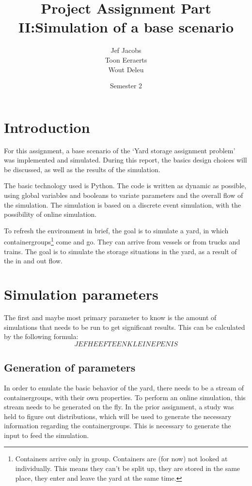 \documentclass[]{article}
\title{Project Assignment Part II:\@ Simulation of a base scenario }
\author{Jef Jacobs \\ Toon Eeraerts \\ Wout Deleu}
\date{Semester 2}
\begin{document}
\setlength{\parindent}{0pt} \maketitle \tableofcontents \newpage %

\section{Introduction}
For this assignment, a base scenario of the `Yard storage assignment problem'
was implemented and simulated. During this report, the basics design choices
will be discussed, as well as the results of the simulation.

The basic technology used is Python. The code is written as dynamic as
possible, using global variables and booleans to variate parameters and the
overall flow of the simulation. The simulation is based on a discrete event
simulation, with the possibility of online simulation.

To refresh the environment in brief, the goal is to simulate a yard, in which
containergroups\footnote{Containers arrive only in group. Containers are (for
	now) not looked at individually. This means they can't be split up, they are
	stored in the same place, they enter and leave the yard at the same time.} come
and go. They can arrive from vessels or from trucks and trains. The goal is to
simulate the storage situations in the yard, as a result of the in and out
flow.

\section{Simulation parameters}
The first and maybe most primary parameter to know is the amount of simulations
that needs to be run to get significant results. This can be calculated by the
following formula: $$ JEF HEEFT EEN KLEINE PENIS $$

\subsection{Generation of parameters}
In order to emulate the basic behavior of the yard, there needs to be a stream
of containergroups, with their own properties. To perform an online simulation,
this stream needs to be generated on the fly. In the prior assignment, a study
was held to figure out distributions, which will be used to generate the
necessary information regarding the containergroups. This is necessary to
generate the input to feed the simulation.
\end{document}
